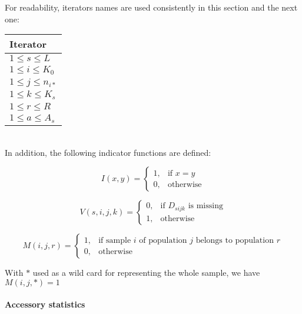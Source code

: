 \documentclass{scrartcl}
\begin{document}
\noindent For readability, iterators names are used consistently in
this section and the next one: \\

\begin{tabular}{l}            \hline
    Iterator               \\ \hline
    $1 \leq s \leq L$      \\
    $1 \leq i \leq K_0$    \\
    $1 \leq j \leq n_{i*}$ \\
    $1 \leq k \leq K_s$    \\
    $1 \leq r \leq R$      \\
    $1 \leq a \leq A_s$    \\ \hline
\end{tabular}
\\

\noindent In addition, the following indicator functions are defined:

\begin{displaymath}
I(x,y) = \begin{cases}
    1, & \text{if } x = y \\
    0, & \text{otherwise}
    \end{cases}
\end{displaymath}

\begin{displaymath}
    V(s,i,j,k) = \begin{cases}
    0, & \text{if } D_{sijk} \text{ is missing}\\
    1, & \text{otherwise}
  \end{cases}
\end{displaymath}

\begin{displaymath}
    M(i,j,r) = \begin{cases}
    1, & \text{if sample } i \text{ of population } j \text{ belongs to population } r \\
    0, & \text{otherwise}
   \end{cases}
\end{displaymath}

With $*$ used as a wild card for representing the whole sample, we have
$M(i,j,*) = 1$ \\

\paragraph{Accessory statistics}
\end{document}
